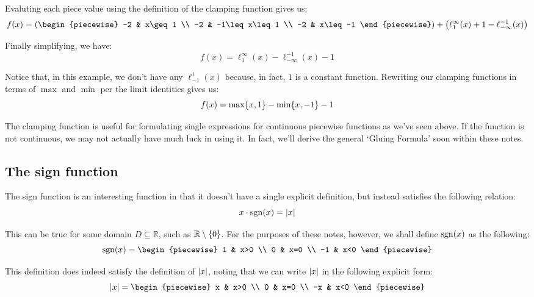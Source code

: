 \begin{example}
    Evaluting each piece value using the definition of the clamping function gives us:
    $$
        f(x) = \paren*{\begin{piecewise}
            -2 & x\geq 1 \\
            -2 & -1\leq x\leq 1 \\
            -2 & x\leq -1
        \end{piecewise}}+\paren*{\ell_{1}^{\infty}(x)+1-\ell_{-\infty}^{-1}(x)}
    $$

    Finally simplifying, we have:
    $$
        f(x) = \ell_{1}^{\infty}(x)-\ell_{-\infty}^{-1}(x)-1
    $$

    Notice that, in this example, we don't have any $\ell_{-1}^{1}(x)$ because, in fact, $1$ is a constant function. Rewriting our clamping functions in terms of $\max$ and $\min$ per the limit identities gives us:
    $$
        f(x) = \max\{x,1\}-\min\{x,-1\}-1
    $$
\end{example}

The clamping function is useful for formulating single expressions for continuous piecewise functions as we've seen above. If the function is not continuous, we may not actually have much luck in using it. In fact, we'll derive the general `Gluing Formula' soon within these notes.

\subsection{The sign function}
The sign function is an interesting function in that it doesn't have a single explicit definition, but instead satisfies the following relation:
$$
    x\cdot\mathrm{\mathop{sgn}}(x)=\abs{x}
$$

This can be true for some domain $D\subseteq\mathbb{R}$, such as $\mathbb{R}\setminus\{0\}$. For the purposes of these notes, however, we shall define $\mathrm{\mathop{sgn}}(x)$ as the following:
$$
    \sgn{x}=\begin{piecewise}
        1 & x>0 \\
        0 & x=0 \\
        -1 & x<0
    \end{piecewise}
$$

This definition does indeed satisfy the definition of $\abs{x}$, noting that we can write $\abs{x}$ in the following explicit form\footnotemark:
$$
    \abs{x}=\begin{piecewise}
        x & x>0 \\
        0 & x=0 \\
        -x & x<0
    \end{piecewise}
$$

